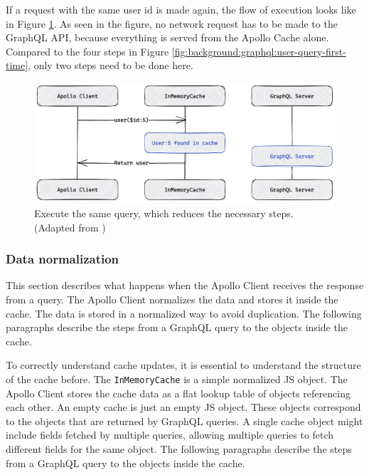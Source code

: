 \noindent If a request with the same user id is made again, the flow of execution looks like in Figure \ref{fig:background:graphql:user-query-second-time}. As seen in the figure, no network request has to be made to the GraphQL \ac{API}, because everything is served from the Apollo Cache alone. Compared to the four steps in Figure \ref{fig:background:graphql:user-query-first-time}, only two steps need to be done here. \cite{misc:-:background:graphql:apollo-client-cache-overview}

\ifshowImages
\begin{figure}[H]
  \centering
  \includegraphics[width=0.7\linewidth]{images/background/graphql/apollo/apollo-client-basic-cache-warm.jpg}
  \caption{Execute the same query, which reduces the necessary steps. (Adapted from \cite{misc:-:background:graphql:apollo-client-cache-overview})}\label{fig:background:graphql:user-query-second-time}
\end{figure}
\fi

\subsubsection{Data normalization}\label{subsubsection:background:graphql:apollo-server-client:data-normalization}

This section describes what happens when the Apollo Client receives the response from a query. The Apollo Client normalizes the data and stores it inside the cache. The data is stored in a normalized way to avoid duplication. The following paragraphs describe the steps from a GraphQL query to the objects inside the cache.

\bigskip

\noindent To correctly understand cache updates, it is essential to understand the structure of the cache before. The \texttt{InMemoryCache} is a simple normalized \ac{JS} object. The Apollo Client stores the cache data as a flat lookup table of objects referencing each other. An empty cache is just an empty \ac{JS} object. These objects correspond to the objects that are returned by GraphQL queries. A single cache object might include fields fetched by multiple queries, allowing multiple queries to fetch different fields for the same object. \cite{misc:-:background:graphql:apollo-client-cache-overview} The following paragraphs describe the steps from a GraphQL query to the objects inside the cache.

